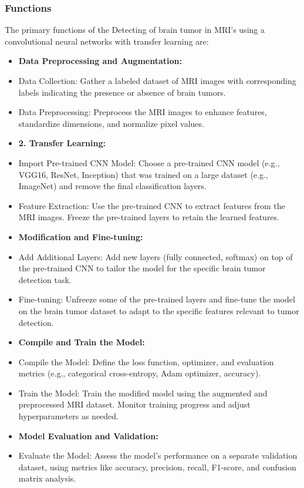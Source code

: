 \subsubsection{Functions}
The primary functions of the Detecting of brain tumor in MRI’s using a convolutional neural networks with transfer
learning are:
\begin{itemize}
    \item \textbf {Data Preprocessing and Augmentation:}
    \item Data Collection:  Gather a labeled dataset of MRI images with corresponding labels indicating the presence or absence of brain tumors.
    \item Data Preprocessing:  Preprocess the MRI images to enhance features, standardize dimensions, and normalize pixel values.  
    \item \textbf{2.   Transfer Learning:}
    \item Import Pre-trained CNN Model:  Choose a pre-trained CNN model (e.g., VGG16, ResNet, Inception) that was trained on a large dataset (e.g., ImageNet) and remove the final classification layers.
    \item Feature Extraction:  Use the pre-trained CNN to extract features from the MRI images. Freeze the pre-trained layers to retain the learned features.             \item \textbf{Modification and Fine-tuning:}
    \item Add Additional Layers:  Add new layers (fully connected, softmax) on top of the pre-trained CNN to tailor the model for the specific brain tumor detection task.
    \item Fine-tuning:  Unfreeze some of the pre-trained layers and fine-tune the model on the brain tumor dataset to adapt to the specific features relevant to tumor detection.             
    \item \textbf{Compile and Train the Model:}
    \item Compile the Model:  Define the loss function, optimizer, and evaluation metrics (e.g., categorical cross-entropy, Adam optimizer, accuracy).
    \item Train the Model:  Train the modified model using the augmented and preprocessed MRI dataset. Monitor training progress and adjust hyperparameters as needed.            \item \textbf{Model Evaluation and Validation:}
    \item Evaluate the Model:  Assess the model's performance on a separate validation dataset, using metrics like accuracy, precision, recall, F1-score, and confusion matrix analysis.

\end{itemize}
